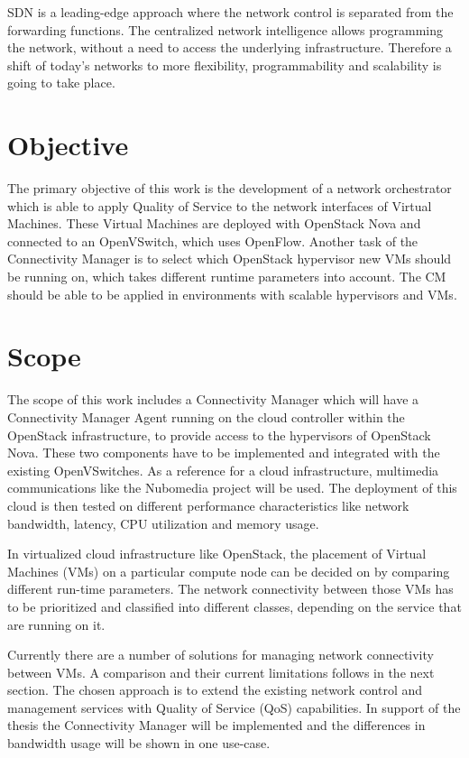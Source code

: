 SDN is a leading-edge approach where the network control is separated from the forwarding functions. The centralized network intelligence allows programming the network, without a need to access the underlying infrastructure. Therefore a shift of today's networks to more flexibility, programmability and scalability is going to take place.

\section{Objective}

The primary objective of this work is the development of a network orchestrator which is able to apply Quality of Service to the network interfaces of Virtual Machines. These Virtual Machines are deployed with OpenStack Nova and connected to an OpenVSwitch, which uses OpenFlow. Another task of the Connectivity Manager is to select which OpenStack hypervisor new VMs should be running on, which takes different runtime parameters into account. The CM should be able to be applied in environments with scalable hypervisors and VMs.

\section{Scope}
The scope of this work includes a Connectivity Manager which will have a Connectivity Manager Agent running on the cloud controller within the OpenStack infrastructure, to provide access to the hypervisors of OpenStack Nova. These two components have to be implemented and integrated with the existing OpenVSwitches. As a reference for a cloud infrastructure, multimedia communications like the Nubomedia project will be used. The deployment of this cloud is then tested on different performance characteristics like network bandwidth, latency, CPU utilization and memory usage.

In virtualized cloud infrastructure like OpenStack, the placement of Virtual Machines (VMs) on a particular compute node can be decided on by comparing different run-time parameters. The network connectivity between those VMs has to be prioritized and classified into different classes, depending on the service that are running on it.

Currently there are a number of solutions for managing network connectivity between VMs. A comparison and their current limitations follows in the next section. The chosen approach is to extend the existing network control and management services with Quality of Service (QoS) capabilities. In support of the thesis the Connectivity Manager will be implemented and the differences in bandwidth usage will be shown in one use-case.

